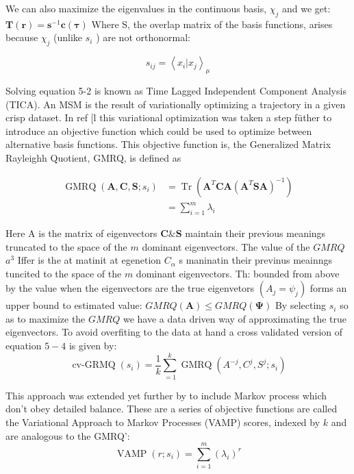 We can also maximize the eigenvalues in the continuous basis, $\chi_{j}$ and we get:
$\mathbf{T}(\mathbf{r})=\mathbf{s}^{-1} \mathbf{c}(\mathbf{\tau})$
Where S, the overlap matrix of the basis functions, arises because $\chi_{j}$ (unlike $s_{i}$ ) are not orthonormal:

\begin{equation}
s_{i j}=\left\langle x_{i} | x_{j}\right\rangle_{\mu}
\end{equation}

Solving equation 5-2 is known as Time Lagged Independent Component Analysis (TICA).
An MSM is the result of variationally optimizing a trajectory in a given crisp dataset. In ref $[\mathrm{l}$ this variational optimization was taken a step füther to introduce an objective function which could be used to optimize between alternative basis functions. This objective function is, the Generalized Matrix Rayleighh Quotient, GMRQ, is defined as

\begin{equation}
\begin{split}
\operatorname{GMRQ}\left(\mathbf{A}, \mathbf{C}, \mathbf{S} ; s_{i}\right) &=\operatorname{Tr}\left(\mathbf{A}^{T} \mathbf{C A}\left(\mathbf{A}^{T} \mathbf{S} \mathbf{A}\right)^{-1}\right) \\
&=\sum_{i=1}^{m} \lambda_{i}
\end{split}
\end{equation}

Here A is the matrix of eigenvectors $\mathbf{C} \& \mathbf{S}$ maintain their previous meanings truncated to the space of the $m$ dominant eigenvectors. The value of the $G M R Q$ $a^{3}$
Iffer is the at matinit at egenetion $C_{\alpha}$ s maninatin their previnus meainngs tuncited to the space of the $m$ dominant eigenvectors. Th: bounded from above by the value when the eigenvectors are the true eigenvetors $\left(A_{j}=\psi_{j}\right)$ forms an upper bound to estimated value:
$G M R Q(\mathbf{A}) \leq G M R Q(\boldsymbol{\Psi})$
By selecting $s_{i}$ so as to maximize the $G M R Q$ we have a data driven way of approximating the true eigenvectors. To avoid overfiting to the data at hand a cross validated version of equation $5-4$ is given by:
\begin{equation}
\operatorname{cv-GRMQ}(s_{i})=\frac{1}{k} \sum_{=1}^{k} \operatorname{GMRQ}\left(A^{-j}, C^{j}, S^{j} ; s_{i}\right)
\end{equation}

This approach was extended yet further by to include Markov process which don't obey detailed balance. These are a series of objective functions are called the Variational Approach to Markov Processes (VAMP) scores, indexed by $k$ and are analogous to the GMRQ':
\begin{equation}
\operatorname{VAMP}(r ; s_{i})=\sum_{i=1}^{m}\left(\lambda_{i}\right)^{r}
\end{equation}

